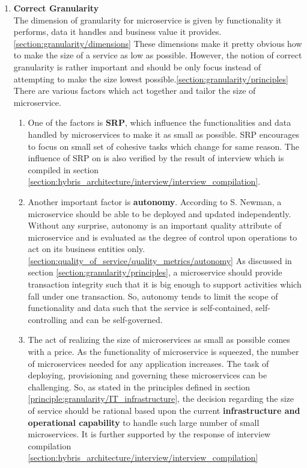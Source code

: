 \begin{enumerate}
\item \textbf{Correct Granularity} \\
The dimension of granularity for microservice is given by functionality it performs, data it handles and business value it provides. \ref{section:granularity/dimensions} These dimensions make it pretty obvious how to make the size of a service as low as possible. However, the notion of correct granularity is rather important and should be only focus instead of attempting to make the size lowest possible.\ref{section:granularity/principles} There are various factors which act together and tailor the size of microservice.
\begin{enumerate}
\item One of the factors is \textbf{\acrshort{SRP}}, which influence the functionalities and data handled by microservices to make it as small as possible. \acrshort{SRP} encourages to focus on small set of cohesive tasks which change for same reason. \cite{Stine:2014aa} \cite{Newman:2015aa} The influence of \acrshort{SRP} on is also verified by the result of interview which is compiled in section \ref{section:hybris_architecture/interview/interview_compilation}.
\item Another important factor is \textbf{autonomy}. According to S. Newman, a microservice should be able to be deployed and updated independently. \cite{Newman:2015aa} Without any surprise, autonomy is an important quality attribute of microservice and is evaluated as the degree of control upon operations to act on its business entities only. \ref{section:quality_of_service/quality_metrics/autonomy} As discussed in section \ref{section:granularity/principles}, a microservice should provide transaction integrity such that it is big enough to support activities which fall under one transaction. So, autonomy tends to limit the scope of functionality and data such that the service is self-contained, self-controlling and can be self-governed.\cite{Ma:2007aa}
\item The act of realizing the size of microservices as small as possible comes with a price. As the functionality of microservice is squeezed, the number of microservices needed for any application increases. The task of deploying, provisioning and governing these microservices can be challenging. So, as stated in the principles defined in section  \ref{principle:granularity/IT_infrastructure},  the decision regarding the size of service should be rational based upon the current \textbf{infrastructure and operational capability} to handle such large number of small microservices. It is further supported by the response of interview compilation \ref{section:hybris_architecture/interview/interview_compilation}

\end{enumerate}
\end{enumerate}
